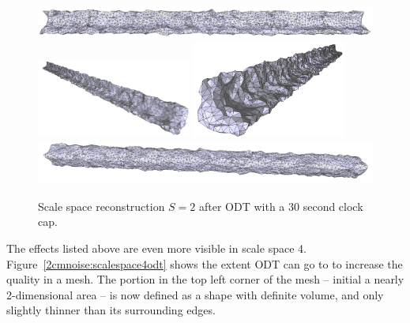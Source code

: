 \documentclass[12pt]{drexelthesis}
\begin{document}
\begin{figure}[!ht]
	
	\centering
		\includegraphics[width=5in]{simulated-lab-scan/2cmnoise/optimizedNeat/scalespace2odt00.png}
		\includegraphics[width=2in]{simulated-lab-scan/2cmnoise/optimizedNeat/scalespace2odt01.png}
		\includegraphics[width=2in]{simulated-lab-scan/2cmnoise/optimizedNeat/scalespace2odt02.png}
		\includegraphics[width=5in]{simulated-lab-scan/2cmnoise/optimizedNeat/scalespace2odt03.png}
		\caption[Scale space reconstruction $S = 2$ after ODT with a 30 second clock cap]{\centering Scale space reconstruction $S = 2$ after ODT with a 30 second clock cap.}
	\label{2cmnoise:scalespace2odt}
\end{figure}

The effects listed above are even more visible in scale space 4. Figure~\ref{2cmnoise:scalespace4odt} shows the extent ODT can go to to increase the quality in a mesh. The portion in the top left corner of the mesh -- initial a nearly 2-dimensional area -- is now defined as a shape with definite volume, and only slightly thinner than its surrounding edges.
\end{document}
